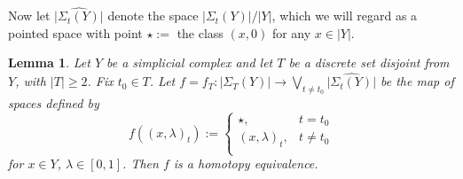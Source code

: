 \documentclass[12pt]{amsart}
\newtheorem{lem}{Lemma}[section]
\theoremstyle{definition}
\newcommand{\<}{\langle}
\renewcommand{\>}{\rangle}
\newcommand{\mc}[2]{\Sigma_{#1}(#2)}
\newcommand{\pmc}[2]{\widehat{|\mc{#1}{#2}|}}
\begin{document}
Now let $\pmc{t}{Y}$ denote the space $|\mc{t}{Y}|/|Y|$, which we will regard as a pointed space with point $\star:=$ the class $(x,0)$ for any $x\in |Y|$.

\begin{lem}\label{lem:homotopy} Let $Y$ be a simplicial complex and let $T$ be a discrete set disjoint from $Y$, with $|T|\geq 2$. Fix $t_0\in T$.
 Let $f=f_T:|\mc{T}{Y}|\to \bigvee_{t\not=t_0}\pmc{t}{Y}$ be the map of spaces defined by
\[
f((x,\lambda)_t):=\left\{
\begin{array}{ll}
\star,& t=t_0\\
(x,\lambda)_t, & t\not= t_0\\
\end{array}
\right.
\]
for $x\in Y$, $\lambda\in [0,1]$.
Then $f$ is a homotopy equivalence.
\end{lem}
\end{document}
